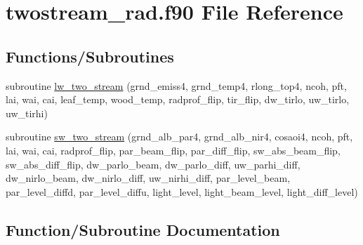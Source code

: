 \hypertarget{twostream__rad_8f90}{}\section{twostream\+\_\+rad.\+f90 File Reference}
\label{twostream__rad_8f90}
\subsection*{Functions/\+Subroutines}
\begin{DoxyCompactItemize}
\item 
subroutine \hyperlink{twostream__rad_8f90_a0e7744abaa83ca4b220040d849e4d956}{lw\+\_\+two\+\_\+stream} (grnd\+\_\+emiss4, grnd\+\_\+temp4, rlong\+\_\+top4, ncoh, pft, lai, wai, cai, leaf\+\_\+temp, wood\+\_\+temp, radprof\+\_\+flip, tir\+\_\+flip, dw\+\_\+tirlo, uw\+\_\+tirlo, uw\+\_\+tirhi)
\item 
subroutine \hyperlink{twostream__rad_8f90_aafe0629c5d8ddcd6eb9a8bb208534489}{sw\+\_\+two\+\_\+stream} (grnd\+\_\+alb\+\_\+par4, grnd\+\_\+alb\+\_\+nir4, cosaoi4, ncoh, pft, lai, wai, cai, radprof\+\_\+flip, par\+\_\+beam\+\_\+flip, par\+\_\+diff\+\_\+flip, sw\+\_\+abs\+\_\+beam\+\_\+flip, sw\+\_\+abs\+\_\+diff\+\_\+flip, dw\+\_\+parlo\+\_\+beam, dw\+\_\+parlo\+\_\+diff, uw\+\_\+parhi\+\_\+diff, dw\+\_\+nirlo\+\_\+beam, dw\+\_\+nirlo\+\_\+diff, uw\+\_\+nirhi\+\_\+diff, par\+\_\+level\+\_\+beam, par\+\_\+level\+\_\+diffd, par\+\_\+level\+\_\+diffu, light\+\_\+level, light\+\_\+beam\+\_\+level, light\+\_\+diff\+\_\+level)
\end{DoxyCompactItemize}


\subsection{Function/\+Subroutine Documentation}
\mbox{\label{twostream__rad_8f90_a0e7744abaa83ca4b220040d849e4d956}} 
